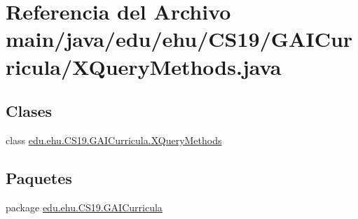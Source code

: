 \hypertarget{a00008}{}\section{Referencia del Archivo main/java/edu/ehu/\+C\+S19/\+G\+A\+I\+Curricula/\+X\+Query\+Methods.java}
\label{a00008}
\subsection*{Clases}
\begin{DoxyCompactItemize}
\item 
class \mbox{\hyperlink{a00032}{edu.\+ehu.\+C\+S19.\+G\+A\+I\+Curricula.\+X\+Query\+Methods}}
\end{DoxyCompactItemize}
\subsection*{Paquetes}
\begin{DoxyCompactItemize}
\item 
package \mbox{\hyperlink{a00017}{edu.\+ehu.\+C\+S19.\+G\+A\+I\+Curricula}}
\end{DoxyCompactItemize}
